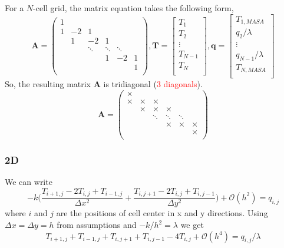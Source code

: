 \documentclass[12pt]{amsart}   %
\begin{document}
For a $N$-cell grid, the matrix equation takes the following form, 
\begin{equation}
\textbf{A}=\begin{pmatrix}
1 &  & & &&\\
1 & -2 & 1 && & \\
& 1 & -2 & 1 && \\
&  & \ddots & \ddots & \ddots& \\
&   && 1 &-2 &1\\
&   & & & &1\\
\end{pmatrix}, \textbf{T}=\begin{bmatrix}
T_{1}\\
{T_{2}}\\
\vdots\\
{T_{N-1}}\\
{T_{N}}\\
\end{bmatrix}, \textbf{q}=\begin{bmatrix}
T_{1,MASA}\\
{q_{2}}/\lambda\\
\vdots\\
{q_{N-1}}/\lambda\\
T_{N,MASA}\\
\end{bmatrix}
\end{equation}
So, the resulting matrix \textbf{A} is tridiagonal (\textcolor{red}{3 diagonals}).
\begin{equation}
\textbf{A}=\begin{pmatrix}
\times &  & & &&\\
\times & \times & \times && & \\
& \times & \times & \times && \\
&  & \ddots & \ddots & \ddots& \\
&   && \times & \times &\times\\
&   & & &  &\times\\
\end{pmatrix}\end{equation}


\subsubsection{2D}
We can write
\begin{equation}
    -k \Bigg(\frac{T_{i+1,j} -2T_{i,j} + T_{i-1,j}}{\Delta x^2}+\frac{T_{i,j+1} -2T_{i,j} + T_{i,j-1}}{\Delta y^2} \Bigg)+\mathcal{O}(h^2) = q_{i,j}
\end{equation}
where $i$ and $j$ are the positions of cell center in x and y directions. Using $\Delta x = \Delta y = h$ from assumptions and $-k/h^2 = \lambda$ we get
\begin{equation}
     T_{i+1,j} + T_{i-1,j}+T_{i,j+1} + T_{i,j-1} -4T_{i,j} +\mathcal{O}(h^4) = q_{i,j} / \lambda
\end{equation}
\end{document}
